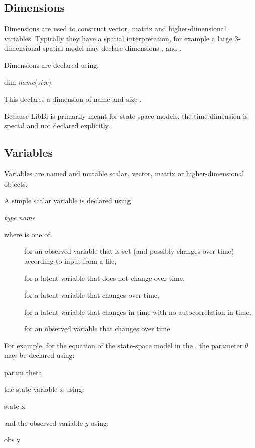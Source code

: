 \subsection{Dimensions\label{Dimensions}}

Dimensions are used to construct vector, matrix and higher-dimensional
variables. Typically they have a spatial interpretation, for example a large
3-dimensional spatial model may declare dimensions ,  and
.

Dimensions are declared using:
\begin{bicode}
dim \emph{name}(\emph{size})
\end{bicode}
This declares a dimension of name  and size
.

\begin{tip}
Because LibBi is primarily meant for state-space models, the time dimension is
special and not declared explicitly.
\end{tip}

\subsection{Variables\label{Variables}}

 Variables are named and
mutable scalar, vector, matrix or higher-dimensional objects.

A simple scalar variable is declared using:
\begin{bicode}
\emph{type} \emph{name}
\end{bicode}
where  is one of:
\begin{description}
\item[] for an observed variable that is set (and possibly changes
  over time) according to input from a file,
\item[] for a latent variable that does not change over time,
\item[] for a latent variable that changes over time,
\item[] for a latent variable that changes in time with no
  autocorrelation in time,
\item[] for an observed variable that changes over time.
\end{description}
For example, for the equation of the state-space model in the
, the parameter $\theta$ may be declared
using:
\begin{bicode}
param theta
\end{bicode}
the state variable $x$ using:
\begin{bicode}
state x
\end{bicode}
and the observed variable $y$ using:
\begin{bicode}
obs y
\end{bicode}

